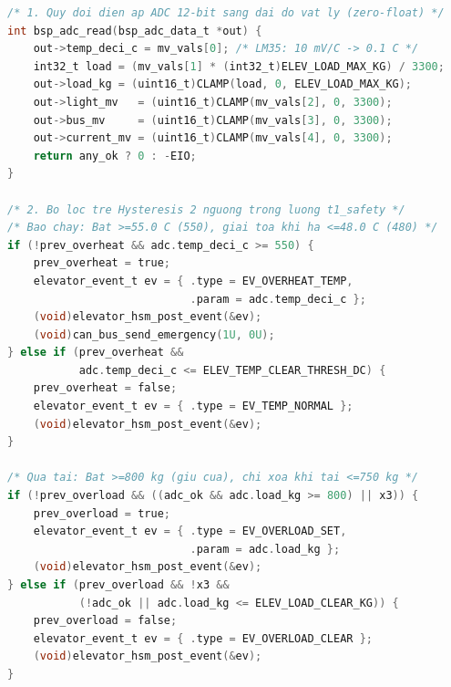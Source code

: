 \begin{lstlisting}[language=C, caption={Quy đổi ADC 5 kênh (bsp\_adc\_sensors.c) và cơ chế Hysteresis trong t1\_safety (main.c)}]
/* 1. Quy doi dien ap ADC 12-bit sang dai do vat ly (zero-float) */
int bsp_adc_read(bsp_adc_data_t *out) {
    out->temp_deci_c = mv_vals[0]; /* LM35: 10 mV/C -> 0.1 C */
    int32_t load = (mv_vals[1] * (int32_t)ELEV_LOAD_MAX_KG) / 3300;
    out->load_kg = (uint16_t)CLAMP(load, 0, ELEV_LOAD_MAX_KG);
    out->light_mv   = (uint16_t)CLAMP(mv_vals[2], 0, 3300);
    out->bus_mv     = (uint16_t)CLAMP(mv_vals[3], 0, 3300);
    out->current_mv = (uint16_t)CLAMP(mv_vals[4], 0, 3300);
    return any_ok ? 0 : -EIO;
}

/* 2. Bo loc tre Hysteresis 2 nguong trong luong t1_safety */
/* Bao chay: Bat >=55.0 C (550), giai toa khi ha <=48.0 C (480) */
if (!prev_overheat && adc.temp_deci_c >= 550) {
    prev_overheat = true;
    elevator_event_t ev = { .type = EV_OVERHEAT_TEMP,
                            .param = adc.temp_deci_c };
    (void)elevator_hsm_post_event(&ev);
    (void)can_bus_send_emergency(1U, 0U);
} else if (prev_overheat &&
           adc.temp_deci_c <= ELEV_TEMP_CLEAR_THRESH_DC) {
    prev_overheat = false;
    elevator_event_t ev = { .type = EV_TEMP_NORMAL };
    (void)elevator_hsm_post_event(&ev);
}

/* Qua tai: Bat >=800 kg (giu cua), chi xoa khi tai <=750 kg */
if (!prev_overload && ((adc_ok && adc.load_kg >= 800) || x3)) {
    prev_overload = true;
    elevator_event_t ev = { .type = EV_OVERLOAD_SET,
                            .param = adc.load_kg };
    (void)elevator_hsm_post_event(&ev);
} else if (prev_overload && !x3 &&
           (!adc_ok || adc.load_kg <= ELEV_LOAD_CLEAR_KG)) {
    prev_overload = false;
    elevator_event_t ev = { .type = EV_OVERLOAD_CLEAR };
    (void)elevator_hsm_post_event(&ev);
}
\end{lstlisting}

